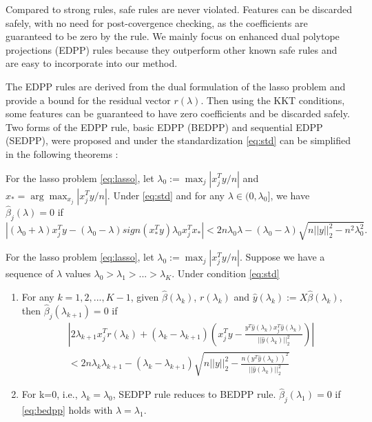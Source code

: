 Compared to strong rules, safe rules are never violated. Features can be discarded safely, with no need for post-covergence checking, as the coefficients are guaranteed to be zero by the rule. We mainly focus on enhanced dual polytope projections (EDPP) rules\citep{wang2013lasso} because they outperform other known safe rules and are easy to incorporate into our method.

The EDPP rules are derived from the dual formulation of the lasso problem and provide a bound for the residual vector $r(\lambda)$. Then using the KKT conditions, some features can be guaranteed to have zero coefficients and be discarded safely. Two forms of the EDPP rule, basic EDPP (BEDPP) and sequential EDPP (SEDPP)\citep{wang2013lasso}, were proposed and under the standardization \eqref{eq:std} can be simplified in the following theorems \citep{Zeng2021}:

\begin{theorem}[BEDPP]
    For the lasso problem \eqref{eq:lasso}, let $\lambda_0:=\max_j|x_j^Ty/n|$ and $x_*=\arg \max_{x_j}|x_j^Ty/n|$. Under \eqref{eq:std} and for any $\lambda\in(0,\lambda_0]$, we have $\hat{\beta}_j(\lambda)=0$ if
    \begin{equation}
        \label{eq:bedpp}
        |(\lambda_0+\lambda)x_j^Ty-(\lambda_0-\lambda)sign(x_*^Ty)\lambda_0x_j^Tx_*|<2n\lambda_0\lambda-(\lambda_0-\lambda)\sqrt{n||y||_2^2-n^2\lambda_0^2}.
    \end{equation}
\end{theorem}

\begin{theorem}[SEDPP]
    For the lasso problem \eqref{eq:lasso}, let $\lambda_0:=\max_j|x_j^Ty/n|$. Suppose we have a sequence of $\lambda$ values $\lambda_0>\lambda_1>...>\lambda_K$. Under condition \eqref{eq:std}
    \begin{enumerate}
        \item For any $k=1,2,...,K-1$, given $\hat{\beta}(\lambda_k)$, $r(\lambda_k)$ and $\hat{y}(\lambda_k):=X\hat{\beta}(\lambda_k)$, then $\hat{\beta}_j(\lambda_{k+1})=0$ if
        \begin{equation}
            \label{eq:sedpp}
            \begin{split}
                &\left|2\lambda_{k+1}x_j^Tr(\lambda_k)+(\lambda_k-\lambda_{k+1})\left( x_j^Ty-\frac{y^T\hat{y}(\lambda_k)x_j^T\hat{y}(\lambda_k)}{||\hat{y}(\lambda_k)||_2^2}\right)\right|\\&<2n\lambda_k\lambda_{k+1}-(\lambda_k-\lambda_{k+1})\sqrt{n||y||_2^2-\frac{n(y^T\hat{y}(\lambda_k))^2}{||\hat{y}(\lambda_k)||_2^2}}
            \end{split}
        \end{equation}
        \item For k=0, i.e., $\lambda_k=\lambda_0$, SEDPP rule reduces to BEDPP rule. $\hat{\beta}_j(\lambda_1)=0$ if \eqref{eq:bedpp} holds with $\lambda=\lambda_1$.
    \end{enumerate}
\end{theorem}

